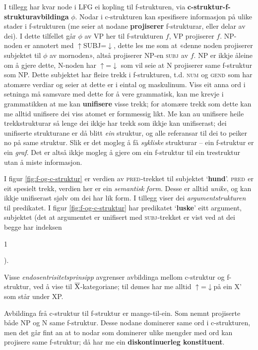 \documentclass[12pt,a4paper,oneside,draft]{report}
\makeatletter
\newcommand{\xbar}{$\rm\overline{X}$}
\newcommand{\ind}[1]{{\avmoptions{center}\begin{avm}\@{#1}\end{avm}}}
\newcommand{\F}[2]{\textsc{#1}\ensuremath{_{#2}}}
\newcommand{\SUBJ}{\F{subj}{}}
\newcommand{\GEND}{\F{gend}{}}
\newcommand{\NUM}{\F{num}{}}
\newcommand{\PRED}{\F{pred}{}}
\newcommand{\ua}{\ensuremath{\uparrow}}
\newcommand{\da}{\ensuremath{\downarrow}}
\newcommand{\p}[1]{`\textbf{#1}'}
\makeatother
\begin{document}
 I tillegg har kvar node i LFG ei kopling til f\hyp{}strukturen, via
 \textbf{c\hyp{}struktur-f\hyp{}strukturavbildinga} $\phi{}$. Nodar i c\hyp{}strukturen kan
 spesifisere informasjon på ulike stader i f\hyp{}strukturen (me seier at
 nodane \textbf{projiserer} f\hyp{}strukturar, eller delar av dei).  I dette
 tilfellet går $\phi$ av VP her til f\hyp{}strukturen $f$, VP projiserer
 $f$. NP-noden er annotert med \ua{}SUBJ=\da{}, dette les me som at
 «denne noden projiserer subjektet til $\phi$ av mornoden», altså
 projiserer NP-en \SUBJ{} av $f$. NP er ikkje åleine om å gjere dette,
 N-noden har \ua{}=\da{} som vil seie at N projiserer same f\hyp{}struktur
 som NP. Dette subjektet har fleire trekk i f\hyp{}strukturen, t.d. \NUM{}
 og \GEND{} som har atomære verdiar og seier at dette er i eintal og
 maskulinum. Viss eit anna ord i setninga må samsvare med dette for å
 vere grammatisk, kan me krevje i grammatikken at me kan \textbf{unifisere}
 visse trekk; for atomære trekk som dette kan me alltid unifisere dei
 viss atomet er formmessig likt. Me kan au unifisere heile
 trekkstrukturar så lenge dei ikkje har trekk som ikkje kan
 unifiserast; dei unifiserte strukturane er då blitt \emph{ein} struktur,
 og alle referansar til dei to peiker no på same struktur. Slik er det
 mogleg å få \emph{sykliske} strukturar -- ein f\hyp{}struktur er ein
 \emph{graf}. Det er altså ikkje mogleg å gjere om ein f\hyp{}struktur til ein
 trestruktur utan å miste informasjon.

 I figur \ref{fig:f-og-c-struktur} er verdien av \PRED{}-trekket til
 subjektet \p{hund}. \PRED{} er eit spesielt trekk, verdien her er ein
 \emph{semantisk form}. Desse er alltid \emph{unike}, og kan ikkje unifiserast
 sjølv om dei har lik form. I tillegg viser dei \emph{argumentstrukturen}
 til predikatet. I figur \ref{fig:f-og-c-struktur} har predikatet
 \p{luske} eitt argument, subjektet (det at argumentet er unifisert
 med \SUBJ{}-trekket er vist ved at dei begge har indeksen \ind{1}).

 Visse \emph{endosentrisitetsprinsipp} avgrenser avbildinga mellom
 c\hyp{}struktur og f\hyp{}struktur, ved å vise til \xbar-kategoriane; til dømes
 har me alltid \ua=\da på ein X' som står under XP.

 Avbildinga frå c\hyp{}struktur til f\hyp{}struktur er mange-til-ein. Som nemnt
 projiserte både NP og N same f\hyp{}struktur. Desse nodane dominerer same
 ord i c\hyp{}strukturen, men det går fint an at to nodar som dominerer
 ulike mengder med ord kan projisere same f\hyp{}struktur; då har me ein
 \textbf{diskontinuerleg konstituent}.
\end{document}
